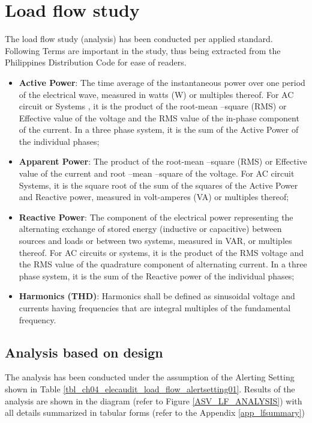 %
\section{Load flow study} \label{ch04_elecaudit_loadflow}
The load flow study (analysis) has been conducted per applied standard. Following Terms are important in the study, thus being extracted from the Philippines Distribution Code for ease of readers.

\begin{itemize}
\item \textbf{Active Power}: The time average of the instantaneous power over one period of the electrical wave, measured in watts  (W) or multiples thereof. For AC circuit or Systems , it is the product of the root-mean –square (RMS) or Effective value of the voltage and the RMS value of the in-phase component of the current. In a three phase system, it is the sum of the Active Power of the individual phases;

\item \textbf{Apparent Power}: The product of the root-mean –square (RMS) or  Effective value of the current and root 	–mean –square of the voltage. For AC circuit Systems, it is the square root of the sum of the squares of the Active Power and Reactive power, measured in volt-amperes (VA) or multiples thereof;


\item \textbf{Reactive Power}: The component of the electrical power representing the alternating exchange of stored energy  (inductive or capacitive) between sources and loads or between two systems, measured in VAR, or multiples thereof. For AC circuits or systems, it is the product of the RMS voltage and the RMS value of the quadrature component of alternating current. In a three phase system, it is the sum of the Reactive power of the individual phases;


\item \textbf{Harmonics (THD)}: Harmonics shall be defined as sinusoidal voltage and currents having frequencies that are integral multiples of the fundamental frequency.

\end{itemize}

\subsection{Analysis based on design}
The analysis has been conducted under the assumption of the Alerting Setting shown in Table \ref{tbl_ch04_elecaudit_load_flow_alertsetting01}. Results of the analysis are shown in the diagram (refer to Figure \ref{ASV_LF_ANALYSIS}) with all details summarized in tabular forms (refer to the Appendix \ref{app_lfsummary})

